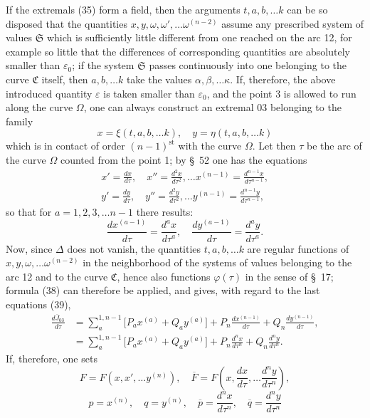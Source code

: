 \documentclass[11pt,a4paper,leqno]{article}
\begin{document}
If the extremals (35) form a field, then the arguments $t,a,b,\ldots k$ can be so disposed that the quantities $x,y,\omega,\omega',\ldots\omega^{(n-2)}$ assume any prescribed system of values $\mathfrak{S}$ which is sufficiently little different from one reached on the arc 12, for example so little that the differences of corresponding quantities are absolutely smaller than $\varepsilon_0$; if the system $\mathfrak{S}$ passes continuously into one belonging to the curve $\mathfrak{C}$ itself, then $a,b,\ldots k$ take the values $\alpha,\beta,\ldots\kappa$. If, therefore, the above introduced quantity $\varepsilon$ is taken smaller than $\varepsilon_0$, and the point 3 is allowed to run along the curve $\Omega$, one can always construct an extremal 03 belonging to the family
\[
x=\xi(t,a,b,\ldots k),\quad y=\eta(t,a,b,\ldots k)
\]
which is in contact of order $(n-1)^{\mathrm{st}}$ with the curve $\Omega$. Let then $\tau$ be the arc of the curve $\Omega$ counted from the point 1; by \S~52 one has the equations
\begin{equation}\tag{39}
\begin{gathered}
x'=\frac{dx}{d\tau},\quad x''=\frac{d^2x}{d\tau^2},\ldots
x^{(n-1)}=\frac{d^{n-1}x}{d\tau^{n-1}},\\
y'=\frac{dy}{d\tau},\quad y''=\frac{d^2y}{d\tau^2},\ldots
y^{(n-1)}=\frac{d^{n-1}y}{d\tau^{n-1}},
\end{gathered}
\end{equation}
so that for $a=1,2,3,\ldots n-1$ there results:
\[
\frac{dx^{(a-1)}}{d\tau}=\frac{d^a x}{d\tau^a},\quad
\frac{dy^{(a-1)}}{d\tau}=\frac{d^a y}{d\tau^a}.
\]
Now, since $\Delta$ does not vanish, the quantities $t,a,b,\ldots k$ are regular functions of $x,y,\omega,\ldots\omega^{(n-2)}$ in the neighborhood of the systems of values belonging to the arc 12 and to the curve $\mathfrak{C}$, hence
also functions $\varphi(\tau)$ in the sense of \S~17; formula (38) can therefore be applied, and gives, with regard to the last equations (39),
\[
\begin{aligned}
\frac{d\overline{J}_{03}}{d\tau}
&=\sum_a^{1,n-1}\bigl[P_ax^{(a)}+Q_ay^{(a)}\bigr]
+P_n\frac{dx^{(n-1)}}{d\tau}
+Q_n\frac{dy^{(n-1)}}{d\tau},\\
&=\sum_a^{1,n-1}\bigl[P_ax^{(a)}+Q_ay^{(a)}\bigr]
+P_n\frac{d^n x}{d\tau^n}
+Q_n\frac{d^n y}{d\tau^n}.
\end{aligned}
\]
If, therefore, one sets
\[
F=F(x,x',\ldots y^{(n)}),\quad
\overline{F}=F\left(x,\frac{dx}{d\tau},\ldots\frac{d^n y}{d\tau^n}\right),
\]
\[
p=x^{(n)},\quad q=y^{(n)},\quad
\overline{p}=\frac{d^n x}{d\tau^n},\quad
\overline{q}=\frac{d^n y}{d\tau^n}
\]
\end{document}
